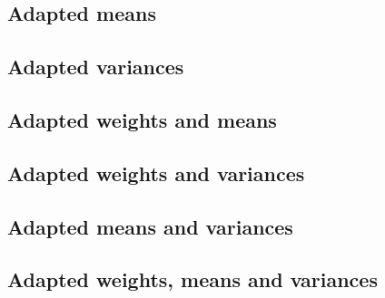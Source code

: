 \subsection{Adapted means}

\subsection{Adapted variances}

\subsection{Adapted weights and means}

\subsection{Adapted weights and variances}

\subsection{Adapted means and variances}

\subsection{Adapted weights, means and variances}